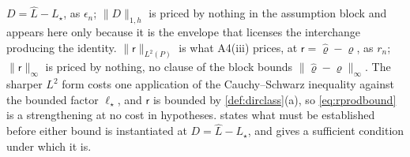 \begin{lemma}
$D=\hat L-L_\star$, as $\epsilon_n$; $\|D\|_{1,h}$ is priced by nothing in the assumption block and
appears here only because it is the envelope that licenses the interchange producing the identity.
$\|\mathsf r\|_{L^{2}(P)}$ is what A4(iii) prices, at $\mathsf r=\hat\varrho-\varrho$, as $r_n$;
$\|\mathsf r\|_\infty$ is priced by nothing, no clause of the block bounds
$\|\hat\varrho-\varrho\|_\infty$. The sharper $L^{2}$ form costs one application of the
Cauchy--Schwarz inequality against the bounded factor $\ell_\star$, and $\mathsf r$ is bounded by
\cref{def:dirclass}(a), so \eqref{eq:rprodbound} is a strengthening at no cost in hypotheses.
 states what must be established before either bound is instantiated at
$D=\hat L-L_\star$, and gives a sufficient condition under which it is.
\end{lemma}

